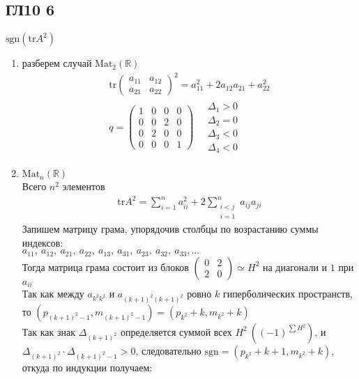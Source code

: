 \subsection*{ГЛ10 6}
$\text{sgn}(\text{tr}A^2)$
\begin{enumerate}
\item 
	разберем случай $\text{Mat}_2(\mathbb{R})$\\
	\begin{gather*}
		\text{tr}
		\begin{pmatrix}
			a_{11} & a_{12}\\
			a_{21} & a_{22}
		\end{pmatrix}^2 = a_{11}^2 + 2a_{12}a_{21} + a^2_{22}\\
		q = 
		\begin{pmatrix}
			1 & 0 & 0 & 0\\
			0 & 0 & 2 & 0\\
			0 & 2 & 0 & 0\\
			0 & 0 & 0 & 1						
		\end{pmatrix}
		\quad
		\begin{matrix}
			\Delta_1 > 0\\
			\Delta_2 = 0\\
			\Delta_3 < 0\\
			\Delta_4 < 0
		\end{matrix}
	\end{gather*}
\item 
	$\text{Mat}_{n}(\mathbb{R})$\\
	Всего $n^2$ элементов
	\begin{gather*}
		\text{tr}A^2 = \sum\limits^{n}_{i=1}a^2_{ii} + 2\sum\limits^{n}_{\substack{i<j \\ i = 1}}a_{ij}a_{ji}
	\end{gather*}
	Запишем матрицу грама, упорядочив столбцы по возрастанию суммы индексов:\\
	$a_{11},\ a_{12},\ a_{21},\ a_{22},\ a_{13},\ a_{31},\ a_{23},\ a_{32},\ a_{33},\ldots$\\
	Тогда матрица грама состоит из блоков 
	$\begin{pmatrix}
		0 & 2\\
		2 & 0
	\end{pmatrix} \simeq H^2$
	на диагонали и $1$ при $a_{ii}$\\
	Так как между $a_{k^2k^2}$ и $a_{(k+1)^2(k+1)^2}$ ровно $k$ гиперболических пространств, то $(p_{(k+1)^2-1}, m_{(k+1)^2-1}) = (p_{k^2}+k, m_{k^2}+k)$\\
	Так как знак $\Delta_{(k+1)^2}$ определяется суммой всех $H^2\ ((-1)^{\sum H^2})$, и $\Delta_{(k+1)^2} \cdot \Delta_{(k+1)^2-1} > 0$, следовательно $\text{sgn} = (p_{k^2}+k+1, m_{k^2}+k)$, откуда по индукции получаем:

\end{enumerate}
